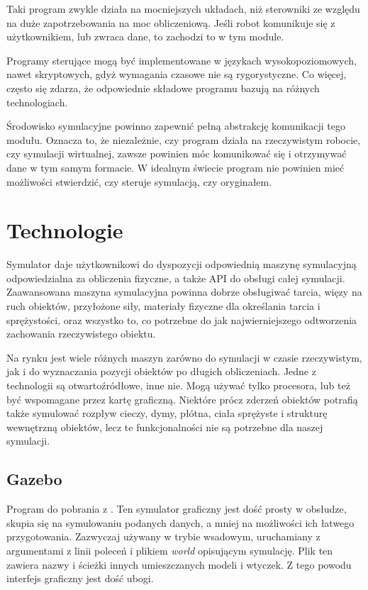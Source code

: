 	Taki program zwykle działa na mocniejszych układach, niż sterowniki ze względu na duże zapotrzebowania na moc obliczeniową.
	Jeśli robot komunikuje się z użytkownikiem, lub zwraca dane, to zachodzi to w tym module. 

	Programy sterujące mogą być implementowane w językach wysokopoziomowych, nawet skryptowych, gdyż wymagania czasowe nie są rygorystyczne.
	Co więcej, często się zdarza, że odpowiednie składowe programu bazują na różnych technologiach.

	Środowisko symulacyjne powinno zapewnić pełną abstrakcję komunikacji tego modułu.
	Oznacza to, że niezależnie, czy program działa na rzeczywistym robocie, czy symulacji wirtualnej, zawsze powinien móc komunikować się i otrzymywać dane w tym samym formacie.
	W idealnym świecie program nie powinien mieć możliwości stwierdzić, czy steruje symulacją, czy oryginałem.

\section{Technologie}
	Symulator daje użytkownikowi do dyspozycji odpowiednią maszynę symulacyjną odpowiedzialna za obliczenia fizyczne, a także API do obsługi całej symulacji.
	Zaawansowana maszyna symulacyjna powinna dobrze obsługiwać tarcia, więzy na ruch obiektów, przyłożone siły, materiały fizyczne dla określania tarcia i sprężystości, 
	oraz wszystko to, co potrzebne do jak najwierniejszego odtworzenia zachowania rzeczywistego obiektu.

	Na rynku jest wiele różnych maszyn zarówno do symulacji w czasie rzeczywistym, jak i do wyznaczania pozycji obiektów po długich obliczeniach.
	Jedne z technologii są otwartoźródłowe, inne nie. Mogą używać tylko procesora, lub też być wspomagane przez kartę graficzną.
	Niektóre prócz zderzeń obiektów potrafią także symulować rozpływ cieczy, dymy, płótna, ciała sprężyste i strukturę wewnętrzną obiektów, lecz te funkcjonalności nie są potrzebne dla naszej symulacji.

	\subsection{Gazebo}
	Program do pobrania z \cite{gazebo_website}. Ten symulator graficzny jest dość prosty w obsłudze, skupia się na symulowaniu podanych danych, a mniej na możliwości ich łatwego przygotowania.
	Zazwyczaj używany w trybie wsadowym, uruchamiany z argumentami z linii poleceń i plikiem \emph{world} opisującym symulację.
	Plik ten zawiera nazwy i ścieżki innych umieszczanych modeli i wtyczek.
	Z tego powodu interfejs graficzny jest dość ubogi.

